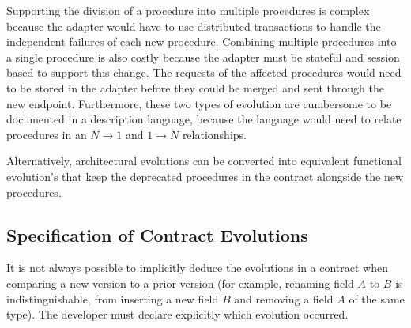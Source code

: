 Supporting the division of a procedure into multiple procedures is complex because the adapter would have to use distributed transactions to handle the independent failures of each new procedure.
Combining multiple procedures into a single procedure is also costly because the adapter must be stateful and session based to support this change.
The requests of the affected procedures would need to be stored in the adapter before they could be merged and sent through the new endpoint.
Furthermore, these two types of evolution are cumbersome to be documented in a description language, because the language would need to relate procedures in an $N\rightarrow 1$ and $1\rightarrow N$ relationships.

Alternatively, architectural evolutions can be converted into equivalent functional evolution's that keep the deprecated procedures in the contract alongside the new procedures.

\subsection{Specification of Contract Evolutions} %
\label{sec:evolution_specification}

It is not always possible to implicitly deduce the evolutions in a contract when comparing a new version to a prior version
(for example, renaming field $A$ to $B$ is indistinguishable, from inserting a new field $B$ and removing a field $A$ of the same type).
The developer must declare explicitly which evolution occurred.

